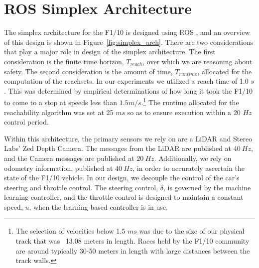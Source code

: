 \documentclass[manuscript,screen,review]{acmart}
\begin{document}
%
%

\section{ROS Simplex Architecture}



\label{section:simplex}
The simplex architecture for the F1/10 is designed using ROS \cite{ROS}, and an overview of this design is shown in Figure~\ref{fig:simplex_arch}. There are two considerations that play a major role in design of the simplex architecture. The first consideration is the finite time horizon, $T_{reach}$, over which we are reasoning about safety. The second consideration is the amount of time, $T_{runtime}$, allocated for the computation of the reachsets. In our experiments we utilized a reach time of 1.0 $s$. This was determined by empirical determinations of how long it took the F1/10 to come to a stop at speeds less than $1.5 m/s.$\footnote{The selection of velocities below 1.5 $ms$ was due to the size of our physical track that was ~13.08 meters in length. Races held by the F1/10 community are around typically 30-50 meters in length with large distances between the track walls.} The runtime allocated for the reachability algorithm was set at 25 $ms$ so as to ensure execution within a 20 $Hz$ control period.  







Within this architecture, the primary sensors we rely on are a LiDAR and Stereo Labs' Zed Depth Camera. The messages from the LiDAR are published at $40 \ Hz$, and the Camera messages are published at $20 \ Hz$. Additionally, we rely on odometry information, published at $40 \ Hz$, in order to accurately ascertain the state of the F1/10 vehicle. In our design, we decouple the control of the car's steering and throttle control. The steering control, $\delta$, is governed by the machine learning controller, and the throttle control is designed to maintain a constant speed, $u$, when the learning-based controller is in use. 
\end{document}

